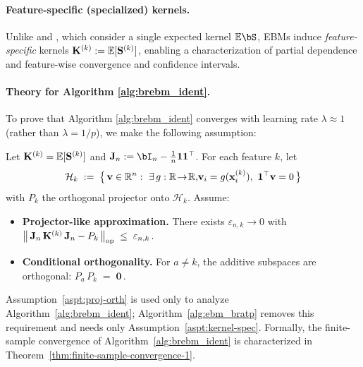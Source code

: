     \paragraph{Feature-specific (specialized) kernels.}
	Unlike \citet{zhou2022boulevard} and \citet{fang2025statistical}, which consider a single expected kernel $\E\bS$, EBMs induce \emph{feature-specific} kernels $\mathbf{K}^{(k)}:=\mathbb{E}[\mathbf{S}^{(k)}]$, enabling a characterization of partial dependence and feature-wise convergence and confidence intervals. 

    \paragraph{Theory for Algorithm \ref{alg:brebm_ident}.}
    \label{subsec:alg.1}
    To prove that Algorithm \ref{alg:brebm_ident} converges with learning rate $\lambda \approx 1$ (rather than $\lambda = 1/p$), we make the following assumption:
	\begin{assumption}
		\label{aspt:proj-orth}
		Let $\mathbf{K}^{(k)}=\mathbb{E}[\mathbf{S}^{(k)}]$ and $\jmat:=\bI_n-\frac{1}{n}\bone\bone^\top$. 
		For each feature $k$, let
		$$
		\mathcal H_k \;:=\; \big\{\,\bv\in\R^n:\ \exists\,g:\R\!\to\!\R\text, \bv_i=g(\bx_i^{(k)}),\ \bone^\top \bv=0\,\big\}
		$$
		with $P_k$ the orthogonal projector onto $\mathcal{H}_k$. Assume:
		\begin{itemize}
			\item \textbf{Projector-like approximation.} There exists $\varepsilon_{n,k}\to 0$ with
			$\big\|\, \mathbf{J}_n\,\mathbf{K}^{(k)}\,\mathbf{J}_n - P_k \,\big\|_{\mathrm{op}} \;\le\; \varepsilon_{n,k}\,.
			$
			\item \textbf{Conditional orthogonality.} For $a\neq k$, the additive subspaces are orthogonal:
			$
			P_a\,P_k \;=\; \mathbf{0}\,.
			$
		\end{itemize}
	\end{assumption}
	Assumption~\ref{aspt:proj-orth} is used only to analyze Algorithm~\ref{alg:brebm_ident}; Algorithm~\ref{alg:ebm_bratp} removes this requirement and needs only Assumption~\ref{aspt:kernel-spec}. Formally, the finite-sample convergence of Algorithm~\ref{alg:brebm_ident} is characterized in Theorem~\ref{thm:finite-sample-convergence-1}.
    

